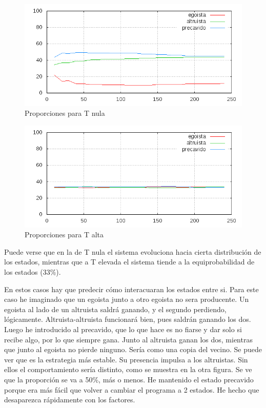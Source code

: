 \documentclass[a4paper,10pt,twocolumn]{article}
\begin{document}
\begin{figure}
\includegraphics[scale=.4]{p-0-1-0-precavido.png}
\caption{Proporciones para T nula}
\end{figure}
\begin{figure}
\includegraphics[scale=.4]{p-10000-1-0-precavido.png}
\caption{Proporciones para T alta}
\end{figure}

Puede verse que en la de T nula el sistema evoluciona hacia cierta distribuci\'on de los estados, mientras que a T elevada el sistema tiende a la equiprobabilidad de los estados (33\%).

En estos casos hay que predecir c\'omo interacuaran los estados entre si. Para este caso he imaginado que un egoista junto a otro egoista no sera producente. Un egoista al lado de un altruista saldr\'a ganando, y el segundo perdiendo, l\'ogicamente. Altruista-altruista funcionar\'a bien, pues saldr\'an ganando los dos. Luego he introducido al precavido, que lo que hace es no fiarse y dar solo si recibe algo, por lo que siempre gana. Junto al altruista ganan los dos, mientras que junto al egoista no pierde ninguno. Ser\'ia como una copia del vecino. Se puede ver que es la estrategia m\'as estable. Su presencia impulsa a los altruistas. Sin ellos el comportamiento ser\'ia distinto, como se muestra en la otra figura. Se ve que la proporci\'on se va a 50\%, m\'as o menos. He mantenido el estado precavido porque era m\'as f\'acil que volver a cambiar el programa a 2 estados. He hecho que desaparezca r\'apidamente con los factores.
\end{document}
